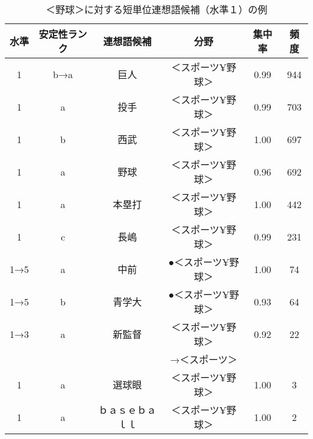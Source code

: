 \begin{table}[t]
 \caption{＜野球＞に対する短単位連想語候補（水準１）の例}
 \begin{center}
  \begin{tabular}{cccccc}
    \hline\hline
	水準 & 安定性ランク & 連想語候補 & 分野 & 集中率 & 頻度 \\
    \hline
	1 & b→a & 巨人 & ＜スポーツ¥野球＞ & 0.99  & 944 \\
	1 & a & 投手 & ＜スポーツ¥野球＞ & 0.99  & 703 \\
	1 & b & 西武 & ＜スポーツ¥野球＞ & 1.00  & 697 \\
	1 & a & 野球 & ＜スポーツ¥野球＞ & 0.96  & 692 \\
	1 & a & 本塁打 & ＜スポーツ¥野球＞ & 1.00  & 442 \\
	1 & c & 長嶋 & ＜スポーツ¥野球＞ & 0.99  & 231 \\
	1→5 & a & 中前 & ●＜スポーツ¥野球＞ & 1.00  & 74 \\
	1→5 & b & 青学大 & ●＜スポーツ¥野球＞ & 0.93  & 64 \\
	1→3 & a & 新監督 & ＜スポーツ¥野球＞ & 0.92  & 22 \\
	 &  &  & →＜スポーツ＞ \\
	1 & a & 選球眼 & ＜スポーツ¥野球＞ & 1.00  & 3 \\
	1 & a & ｂａｓｅｂａｌｌ & ＜スポーツ¥野球＞ & 1.00  & 2 \\
    \hline
  \end{tabular}
 \end{center}
\end{table}

